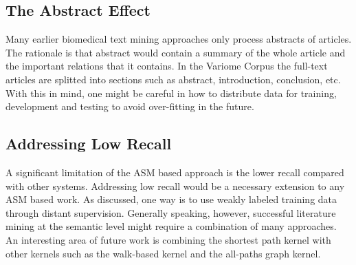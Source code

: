 \subsection{The Abstract Effect}
Many earlier biomedical text mining approaches only process abstracts of articles. The rationale is that abstract would contain a summary of the whole article and the important relations that it contains. In the Variome Corpus the full-text articles are splitted into sections such as abstract, introduction, conclusion, etc. With this in mind, one might be careful in how to distribute data for training, development and testing to avoid over-fitting in the future.
\subsection{Addressing Low Recall}
A significant limitation of the ASM based approach is the lower recall compared with other systems. Addressing low recall would be a necessary extension to any ASM based work. As discussed, one way is to use weakly labeled training data through distant supervision. Generally speaking, however, successful literature mining at the semantic level might require a combination of many approaches. An interesting area of future work is combining the shortest path kernel with other kernels such as the walk-based kernel\cite{kim2008kernel} and the all-paths graph kernel\cite{airola2008all}. 